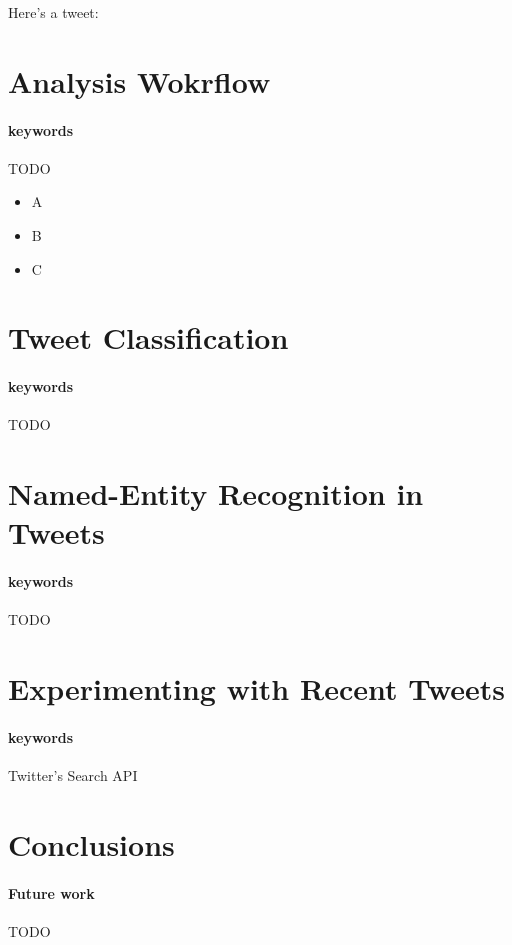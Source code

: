 \documentclass[letterpaper,twocolumn,10pt]{article}
\begin{document}
Here's a tweet:


	

\section{Analysis Wokrflow}

\paragraph{keywords} TODO

\begin{itemize}[noitemsep,nolistsep]
	\item A
	\item B
	\item C
\end{itemize}


\section{Tweet Classification}

\paragraph{keywords} TODO

\section{Named-Entity Recognition in Tweets}

\paragraph{keywords} TODO

\section{Experimenting with Recent Tweets}

\paragraph{keywords} Twitter's Search API

\section{Conclusions}

\paragraph{Future work} TODO


{\footnotesize 
}

\theendnotes
\end{document}
